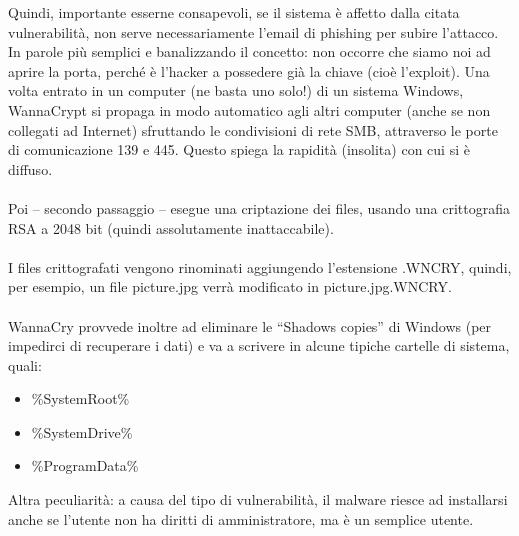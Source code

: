 \documentclass[8pt]{extarticle}
\begin{document}
Quindi, importante esserne consapevoli, se il sistema è affetto dalla citata vulnerabilità, non serve 
necessariamente l’email di phishing per subire l’attacco. In parole più semplici e banalizzando il concetto: 
non occorre che siamo noi ad aprire la porta, perché è l’hacker a possedere già la chiave (cioè l’exploit). 
Una volta entrato in un computer (ne basta uno solo!) di un sistema Windows, WannaCrypt si propaga in modo 
automatico agli altri computer (anche se non collegati ad Internet) sfruttando le condivisioni di rete SMB, 
attraverso le porte di comunicazione 139 e 445. Questo spiega la rapidità (insolita) con cui si è diffuso.\\\\
Poi – secondo passaggio – esegue una criptazione dei files, usando una crittografia RSA a 2048 bit (quindi 
assolutamente inattaccabile).\\\\
I files crittografati vengono rinominati aggiungendo l’estensione .WNCRY, quindi, per esempio, un file 
picture.jpg verrà modificato in picture.jpg.WNCRY.\\\\
WannaCry provvede inoltre ad eliminare le “Shadows copies” di Windows (per impedirci di recuperare i dati) 
e va a scrivere in alcune tipiche cartelle di sistema, quali:
\begin{itemize}
    \item \%SystemRoot\%
    \item \%SystemDrive\%
    \item \%ProgramData\%
\end{itemize}
Altra peculiarità: a causa del tipo di vulnerabilità, il malware riesce ad installarsi anche se l’utente non 
ha diritti di amministratore, ma è un semplice utente.
\end{document}
